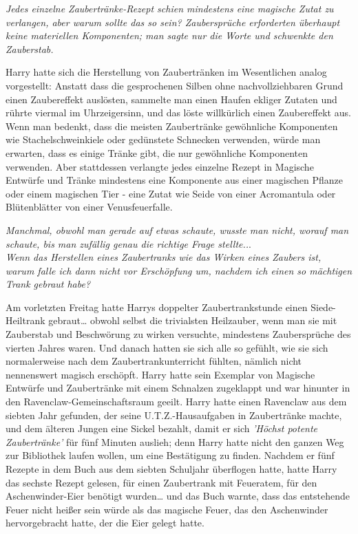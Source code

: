 {\emph{Jedes einzelne Zaubertränke-Rezept schien mindestens eine magische Zutat zu verlangen, aber warum sollte das so sein? Zaubersprüche erforderten überhaupt keine materiellen Komponenten; man sagte nur die Worte und schwenkte den Zauberstab.}

Harry hatte sich die Herstellung von Zaubertränken im Wesentlichen analog vorgestellt: Anstatt dass die gesprochenen Silben ohne nachvollziehbaren Grund einen Zaubereffekt auslösten, sammelte man einen Haufen ekliger Zutaten und rührte viermal im Uhrzeigersinn, und das löste willkürlich einen Zaubereffekt aus. Wenn man bedenkt, dass die meisten Zaubertränke gewöhnliche Komponenten wie Stachelschweinkiele oder gedünstete Schnecken verwenden, würde man erwarten, dass es einige Tränke gibt, die nur gewöhnliche Komponenten verwenden. Aber stattdessen verlangte jedes einzelne Rezept in Magische Entwürfe und Tränke mindestens eine Komponente aus einer magischen Pflanze oder einem magischen Tier - eine Zutat wie Seide von einer Acromantula oder Blütenblätter von einer Venusfeuerfalle.

\emph{Manchmal, obwohl man gerade auf etwas schaute, wusste man nicht, worauf man schaute, bis man zufällig genau die richtige Frage stellte..}.\\ \emph{Wenn das Herstellen eines Zaubertranks wie das Wirken eines Zaubers ist, warum falle ich dann nicht vor Erschöpfung um, nachdem ich einen so mächtigen Trank gebraut habe?}

Am vorletzten Freitag hatte Harrys doppelter Zaubertrankstunde einen Siede-Heiltrank gebraut… obwohl selbst die trivialsten Heilzauber, wenn man sie mit Zauberstab und Beschwörung zu wirken versuchte, mindestens Zaubersprüche des vierten Jahres waren. Und danach hatten sie sich alle so gefühlt, wie sie sich normalerweise nach dem Zaubertrankunterricht fühlten, nämlich nicht nennenswert magisch erschöpft. Harry hatte sein Exemplar von Magische Entwürfe und Zaubertränke mit einem Schnalzen zugeklappt und war hinunter in den Ravenclaw-Gemeinschaftsraum geeilt. Harry hatte einen Ravenclaw aus dem siebten Jahr gefunden, der seine U.T.Z.-Hausaufgaben in Zaubertränke machte, und dem älteren Jungen eine Sickel bezahlt, damit er sich \emph{'Höchst potente Zaubertränke'} für fünf Minuten auslieh; denn Harry hatte nicht den ganzen Weg zur Bibliothek laufen wollen, um eine Bestätigung zu finden. Nachdem er fünf Rezepte in dem Buch aus dem siebten Schuljahr überflogen hatte, hatte Harry das sechste Rezept gelesen, für einen Zaubertrank mit Feueratem, für den Aschenwinder-Eier benötigt wurden… und das Buch warnte, dass das entstehende Feuer nicht heißer sein würde als das magische Feuer, das den Aschenwinder hervorgebracht hatte, der die Eier gelegt hatte.

}
